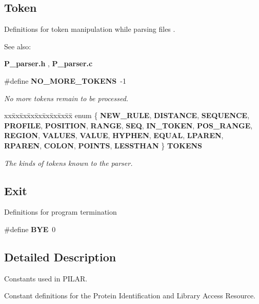 \subsection*{Token}
Definitions for token manipulation while parsing files .

\begin{Desc}
\item[See also: ]\par
{\bf P\_\-parser.h} , {\bf P\_\-parser.c}\end{Desc}
\begin{CompactItemize}
\item 
\#define {\bf NO\_\-MORE\_\-TOKENS}\ -1
\begin{CompactList}\small\item\em No more tokens remain to be processed.\item\end{CompactList}\item 
\begin{tabbing}
xx\=xx\=xx\=xx\=xx\=xx\=xx\=xx\=xx\=\kill
enum \{ {\bf NEW\_\-RULE}, 
{\bf DISTANCE}, 
{\bf SEQUENCE}, 
{\bf PROFILE}, 
{\bf POSITION}, 
{\bf RANGE}, 
{\bf SEQ}, 
{\bf IN\_\-TOKEN}, 
{\bf POS\_\-RANGE}, 
{\bf REGION}, 
{\bf VALUES}, 
{\bf VALUE}, 
{\bf HYPHEN}, 
{\bf EQUAL}, 
{\bf LPAREN}, 
{\bf RPAREN}, 
{\bf COLON}, 
{\bf POINTS}, 
{\bf LESSTHAN}
 \} {\bf TOKENS}
\end{tabbing}
\begin{CompactList}\small\item\em The kinds of tokens known to the parser.\item\end{CompactList}\end{CompactItemize}
\subsection*{Exit}
Definitions for program termination\begin{CompactItemize}
\item 
\#define {\bf BYE}\ 0
\end{CompactItemize}


\subsection{Detailed Description}
Constants used in PILAR.

 

 Constant definitions for the Protein Identification and  Library Access Resource.

